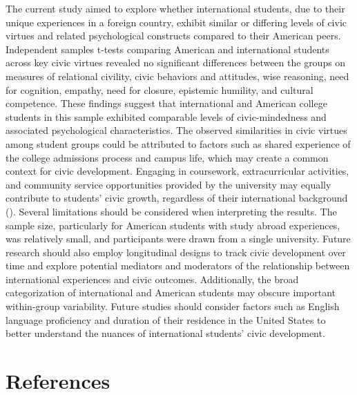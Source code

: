 \documentclass[
  man,
  floatsintext,
  longtable,
  nolmodern,
  notxfonts,
  notimes,
  colorlinks=true,linkcolor=blue,citecolor=blue,urlcolor=blue]{apa7}
\begin{document}
The current study aimed to explore whether international students, due
to their unique experiences in a foreign country, exhibit similar or
differing levels of civic virtues and related psychological constructs
compared to their American peers. Independent samples t-tests comparing
American and international students across key civic virtues revealed no
significant differences between the groups on measures of relational
civility, civic behaviors and attitudes, wise reasoning, need for
cognition, empathy, need for closure, epistemic humility, and cultural
competence. These findings suggest that international and American
college students in this sample exhibited comparable levels of
civic-mindedness and associated psychological characteristics. The
observed similarities in civic virtues among student groups could be
attributed to factors such as shared experience of the college
admissions process and campus life, which may create a common context
for civic development. Engaging in coursework, extracurricular
activities, and community service opportunities provided by the
university may equally contribute to students' civic growth, regardless
of their international background
(). Several limitations should be considered when interpreting the
results. The sample size, particularly for American students with study
abroad experiences, was relatively small, and participants were drawn
from a single university. Future research should also employ
longitudinal designs to track civic development over time and explore
potential mediators and moderators of the relationship between
international experiences and civic outcomes. Additionally, the broad
categorization of international and American students may obscure
important within-group variability. Future studies should consider
factors such as English language proficiency and duration of their
residence in the United States to better understand the nuances of
international students' civic development.

\clearpage

\section{References}\label{references}
\end{document}
